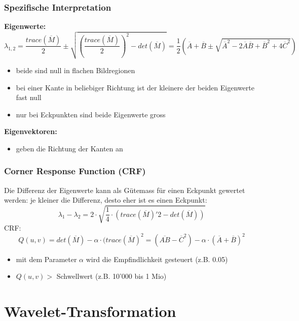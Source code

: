 \documentclass[10pt]{article}
\begin{document}
\subsubsection{Spezifische Interpretation}
\textbf{Eigenwerte:}
\begin{equation*}
	\lambda_{1,2} = \frac{trace(\overline{M})}{2} \pm \sqrt{\left( \frac{trace(\overline{M})}{2} \right)^2 - det(\overline{M})} = \frac{1}{2} \left( \overline{A} + \overline{B} \pm \sqrt{\overline{A}^2 - 2 \overline{A} \overline{B} + \overline{B}^2 + 4 \overline{C}^2} \right)
\end{equation*}
\begin{itemize}
	\item beide sind null in flachen Bildregionen
	\item bei einer Kante in beliebiger Richtung ist der kleinere der beiden Eigenwerte fast null
	\item nur bei Eckpunkten sind beide Eigenwerte gross
\end{itemize}
\textbf{Eigenvektoren:}
\begin{itemize}
	\item geben die Richtung der Kanten an
\end{itemize}
\subsubsection{Corner Response Function (CRF)}
Die Differenz der Eigenwerte kann als Gütemass für einen Eckpunkt gewertet werden: je kleiner die Differenz, desto eher ist es einen Eckpunkt:
\begin{equation*}
	\lambda_1 - \lambda_2 = 2 \cdot \sqrt{\frac{1}{4} \cdot \left( trace(\overline{M})'2 - det(\overline{M}) \right)}
\end{equation*}
CRF:
\begin{equation*}
	Q(u,v) = det(\overline{M}) - \alpha \cdot (trace(\overline{M})^2 = (\overline{AB} - \overline{C}^2) - \alpha \cdot (\overline{A} + \overline{B})^2
\end{equation*}
\begin{itemize}
	\item mit dem Parameter $\alpha$ wird die Empfindlichkeit gesteuert (z.B. 0.05)
	\item $Q(u,v) >$ Schwellwert (z.B. 10'000 bis 1 Mio)
\end{itemize}

\pagebreak
\section{Wavelet-Transformation}
\end{document}
